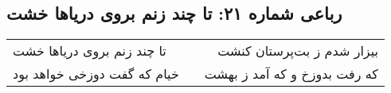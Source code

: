 \begin{center}
\section*{رباعی شماره ۲۱: تا چند زنم بروی دریاها خشت}
\label{sec:sh021}
\begin{longtable}{l p{0.5cm} r}
تا چند زنم بروی دریاها خشت
&&
بیزار شدم ز بت‌پرستان کنشت
\\
خیام که گفت دوزخی خواهد بود
&&
که رفت بدوزخ و که آمد ز بهشت
\\
\end{longtable}
\end{center}
